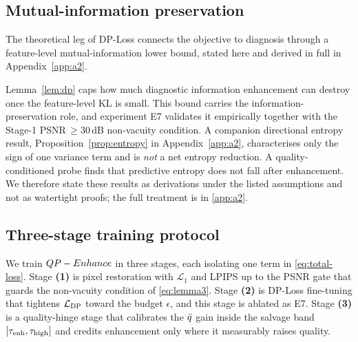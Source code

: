 \subsection{Mutual-information preservation}\label{sec:prop3lemma3}
The theoretical leg of DP-Loss connects the objective to diagnosis through a feature-level
mutual-information lower bound, stated here and derived in full in Appendix~\ref{app:a2}.

Lemma~\ref{lem:dp} caps how much diagnostic information enhancement can destroy once the
feature-level KL is small. This bound carries the information-preservation role, and experiment E7
validates it empirically together with the Stage-1 PSNR$\,\geq30$\,dB non-vacuity condition. A
companion directional entropy result, Proposition~\ref{prop:entropy} in Appendix~\ref{app:a2},
characterises only the sign of one variance term and is \emph{not} a net entropy reduction. A
quality-conditioned probe finds that predictive entropy does not fall after enhancement. We therefore
state these results as derivations under the listed assumptions and not as watertight proofs; the full
treatment is in \cref{app:a2}.

\subsection{Three-stage training protocol}\label{sec:training}
We train $QP-Enhance$ in three stages, each isolating one term in \eqref{eq:total-loss}. Stage
\textbf{(1)} is pixel restoration with $\mathcal{L}_1$ and LPIPS up to the PSNR gate that guards the
non-vacuity condition of \eqref{eq:lemma3}. Stage \textbf{(2)} is DP-Loss fine-tuning that tightens
$\mathcal{L}_{\mathrm{DP}}$ toward the budget $\epsilon$, and this stage is ablated as E7. Stage \textbf{(3)} is a
quality-hinge stage that calibrates the $\bar{q}$ gain inside the salvage band $[\tau_{\mathrm{enh}},\tau_{\mathrm{high}}]$ and
credits enhancement only where it measurably raises quality.
